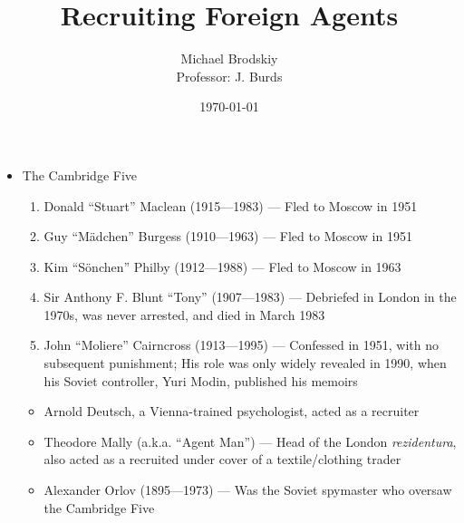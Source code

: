

\title{Recruiting Foreign Agents}
\date{\today}
\author{Michael Brodskiy\\ \small Professor: J. Burds}



\maketitle

\begin{itemize}

  \item The Cambridge Five

    \begin{enumerate}

      \item Donald ``Stuart'' Maclean (1915—1983) — Fled to Moscow in 1951

      \item Guy ``M\"adchen'' Burgess (1910—1963) — Fled to Moscow in 1951

      \item Kim ``S\"onchen'' Philby (1912—1988) — Fled to Moscow in 1963

      \item Sir Anthony F. Blunt ``Tony'' (1907—1983) — Debriefed in London in the 1970s, was never arrested, and died in March 1983

      \item John ``Moliere'' Cairncross (1913—1995)  — Confessed in 1951, with no subsequent punishment; His role was only widely revealed in 1990, when his Soviet controller, Yuri Modin, published his memoirs

    \end{enumerate}

    \vspace{-15pt}

    \begin{itemize}

      \item Arnold Deutsch, a Vienna-trained psychologist, acted as a recruiter 

      \item Theodore Mally (a.k.a. ``Agent Man'') — Head of the London \textit{rezidentura}, also acted as a recruited under cover of a textile/clothing trader

      \item Alexander Orlov (1895—1973) — Was the Soviet spymaster who oversaw the Cambridge Five


\end{itemize}
\end{itemize}
